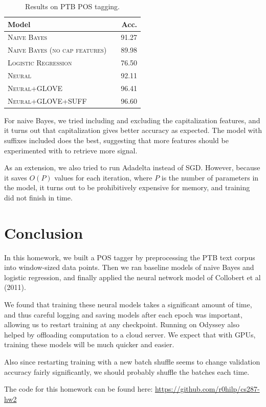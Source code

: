 \documentclass[11pt]{article}
\begin{document}
\begin{table}[h]
\centering
\begin{tabular}{llr}
 \toprule
 Model &  & Acc. \\
 \midrule
 \textsc{Naive Bayes} & & 91.27\\
 \textsc{Naive Bayes (no cap features)} & & 89.98 \\
 \textsc{Logistic Regression} & & 76.50 \\
 \textsc{Neural} & & 92.11  \\
 \textsc{Neural+GLOVE} & &96.41 \\
 \textsc{Neural+GLOVE+SUFF} & & 96.60 \\
 \bottomrule
\end{tabular}
\caption{\label{tab:results} Results on PTB POS tagging.}
\end{table}

For naive Bayes, we tried including and excluding the capitalization features, and it turns out that capitalization gives better accuracy as expected. The model with suffixes included does the best, suggesting that more features should be experimented with to retrieve more signal.


As an extension, we also tried to run Adadelta instead of SGD. However, because it saves $O(P)$ values for each iteration, where $P$ is the number of parameters in the model, it turns out to be prohibitively expensive for memory, and training did not finish in time.

\section{Conclusion}

In this homework, we built a POS tagger by preprocessing the PTB text corpus into window-sized data points. Then we ran baseline models of naive Bayes and logistic regression, and finally applied the neural network model of Collobert et al (2011).

We found that training these neural models takes a significant amount of time, and thus careful logging and saving models after each epoch was important, allowing us to restart training at any checkpoint. Running on Odyssey also helped by offloading computation to a cloud server. We expect that with GPUs, training these models will be much quicker and easier.

Also since restarting training with a new batch shuffle seems to change validation accuracy fairly significantly, we should probably shuffle the batches each time.

The code for this homework can be found here: \url{https://github.com/r0hilp/cs287-hw2}



\end{document}
